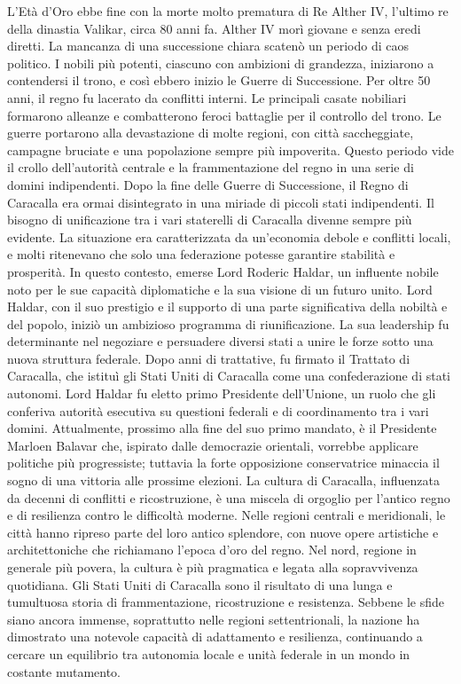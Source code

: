 \documentclass[10pt, a4paper]{report}
\begin{document}
\begin{multicols}{2}
L'Età d'Oro ebbe fine con la morte molto prematura di Re Alther IV, l'ultimo re della dinastia Valikar, circa 80 anni fa. Alther IV morì giovane e senza eredi diretti. La mancanza di una successione chiara scatenò un periodo di caos politico. I nobili più potenti, ciascuno con ambizioni di grandezza, iniziarono a contendersi il trono, e così ebbero inizio le Guerre di Successione.
Per oltre 50 anni, il regno fu lacerato da conflitti interni. Le principali casate nobiliari formarono alleanze e combatterono feroci battaglie per il controllo del trono. Le guerre portarono alla devastazione di molte regioni, con città saccheggiate, campagne bruciate e una popolazione sempre più impoverita. Questo periodo vide il crollo dell’autorità centrale e la frammentazione del regno in una serie di domini indipendenti.
Dopo la fine delle Guerre di Successione, il Regno di Caracalla era ormai disintegrato in una miriade di piccoli stati indipendenti.
Il bisogno di unificazione tra i vari staterelli di Caracalla divenne sempre più evidente. La situazione era caratterizzata da un'economia debole e conflitti locali, e molti ritenevano che solo una federazione potesse garantire stabilità e prosperità.
In questo contesto, emerse Lord Roderic Haldar, un influente nobile noto per le sue capacità diplomatiche e la sua visione di un futuro unito. Lord Haldar, con il suo prestigio e il supporto di una parte significativa della nobiltà e del popolo, iniziò un ambizioso programma di riunificazione. La sua leadership fu determinante nel negoziare e persuadere diversi stati a unire le forze sotto una nuova struttura federale. Dopo anni di trattative, fu firmato il Trattato di Caracalla, che istituì gli Stati Uniti di Caracalla come una confederazione di stati autonomi. Lord Haldar fu eletto primo Presidente dell'Unione, un ruolo che gli conferiva autorità esecutiva su questioni federali e di coordinamento tra i vari domini.
Attualmente, prossimo alla fine del suo primo mandato, è il Presidente Marloen Balavar che, ispirato dalle democrazie orientali, vorrebbe applicare politiche più progressiste; tuttavia la forte opposizione conservatrice minaccia il sogno di una vittoria alle prossime elezioni.
La cultura di Caracalla, influenzata da decenni di conflitti e ricostruzione, è una miscela di orgoglio per l’antico regno e di resilienza contro le difficoltà moderne. Nelle regioni centrali e meridionali, le città hanno ripreso parte del loro antico splendore, con nuove opere artistiche e architettoniche che richiamano l'epoca d'oro del regno. Nel nord, regione in generale più povera, la cultura è più pragmatica e legata alla sopravvivenza quotidiana.
Gli Stati Uniti di Caracalla sono il risultato di una lunga e tumultuosa storia di frammentazione, ricostruzione e resistenza. Sebbene le sfide siano ancora immense, soprattutto nelle regioni settentrionali, la nazione ha dimostrato una notevole capacità di adattamento e resilienza, continuando a cercare un equilibrio tra autonomia locale e unità federale in un mondo in costante mutamento.


\end{multicols}
\end{document}
